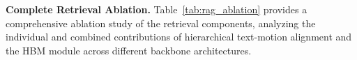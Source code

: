 \documentclass[10pt,journal,compsoc]{IEEEtran}
\begin{document}
\begin{table}[t]
    \centering
    \renewcommand{\arraystretch}{1.0}  %
    \caption{Temporal retrieval experiment on HumanML3D.}
    \label{tab:temporal}
\end{table}

\textbf{Complete Retrieval Ablation.}
Table~\ref{tab:rag_ablation} provides a comprehensive ablation study of the retrieval components, analyzing the individual and combined contributions of hierarchical text-motion alignment and the HBM module across different backbone architectures.
\end{document}

